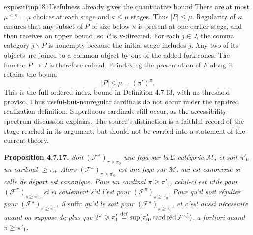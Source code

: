 \begin{dcomment}{exposition}{p181}{Usefulness already gives the quantitative bound}
There are at most $\mu^{<\kappa}=\mu$ choices at each stage and $\kappa\leq\mu$ stages. Thus $|P|\leq\mu$. Regularity of $\kappa$ ensures that any subset of $P$ of size below $\kappa$ is present at one earlier stage, and then receives an upper bound, so $P$ is $\kappa$-directed. For each $j\in J$, the comma category $j\backslash P$ is nonempty because the initial stage includes $j$. Any two of its objects are joined to a common object by one of the added fork cones. The functor $P\to J$ is therefore cofinal. Reindexing the presentation of $F$ along it retains the bound
\[
 |P|\leq\mu=(\pi')^\pi.
\]
This is the full ordered-index bound in Definition 4.7.13, with no threshold proviso. Thus useful-but-nonregular cardinals do not occur under the repaired realization definition. Superfluous cardinals still occur, as the accessibility-spectrum discussion explains. The source's distinction is a faithful record of the stage reached in its argument, but should not be carried into a statement of the current theory.
\end{dcomment}


\textbf{Proposition 4.7.17.} \textit{Soit $(\mathcal{F}^{\pi})_{\pi\geqslant\pi_0}$ une fcga sur la $\mathfrak{U}$-catégorie $\mathcal{M}$, et soit $\pi'_0$ un cardinal $\geqslant\pi_0$. Alors $(\mathcal{F}^{\pi})_{\pi\geqslant\pi'_0}$ est une fcga sur $\mathcal{M}$, qui est canonique si celle de départ est canonique. Pour un cardinal $\pi\geqslant\pi'_0$, celui-ci est utile pour $(\mathcal{F}^{\pi})_{\pi\geqslant\pi'_0}$ si et seulement s'il l'est pour $(\mathcal{F}^{\pi})_{\pi\geqslant\pi_0}$. Pour qu'il soit régulier pour $(\mathcal{F}^{\pi})_{\pi\geqslant\pi'_0}$, il} suffit \textit{qu'il le soit pour $(\mathcal{F}^{\pi})_{\pi\geqslant\pi_0}$, et c'est aussi nécessaire quand on suppose de plus que $2^{\pi}\geqslant\pi'_1\overset{\text{déf}}{=}\sup(\pi'_0,\mathop{\textup{card\,réd}}\nolimits\mathcal{F}^{\pi'_0})$, a fortiori quand $\pi\geqslant\pi'_1$.}

